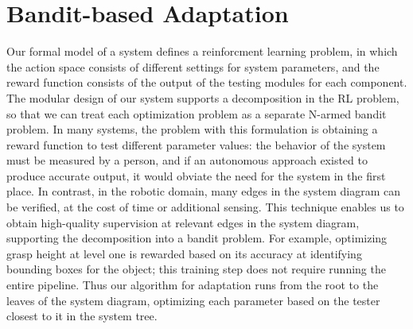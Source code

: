 \documentclass{article}
\begin{document}



\section{Bandit-based Adaptation}

Our formal model of a system defines a reinforcment learning problem,
in which the action space consists of different settings for system
parameters, and the reward function consists of the output of the
testing modules for each component.  The modular design of our system
supports a decomposition in the RL problem, so that we can treat each
optimization problem as a separate N-armed bandit problem.  In many
systems, the problem with this formulation is obtaining a reward
function to test different parameter values: the behavior of the
system must be measured by a person, and if an autonomous approach
existed to produce accurate output, it would obviate the need for the
system in the first place.  In contrast, in the robotic domain, many
edges in the system diagram can be verified, at the cost of time or
additional sensing.  This technique enables us to obtain high-quality
supervision at relevant edges in the system diagram, supporting the
decomposition into a bandit problem.  For example, optimizing grasp
height at level one is rewarded based on its accuracy at identifying
bounding boxes for the object; this training step does not require
running the entire pipeline.  Thus our algorithm for adaptation runs
from the root to the leaves of the system diagram, optimizing each
parameter based on the tester closest to it in the system tree.
\end{document}
